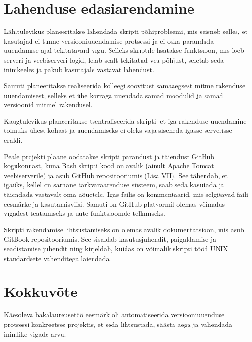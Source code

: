 \documentclass[12pt]{article}
\begin{document}
  \newpage
  
  \section{Lahenduse edasiarendamine}
  
  Lähitulevikus planeeritakse lahendada skripti põhiprobleemi, mis seisneb selles, et kasutajad ei tunne versiooniuuendamise protsessi ja ei oska parandada uuendamise ajal tekitatavaid vigu. Selleks skriptile lisatakse funktsioon, mis loeb serveri ja veebiserveri logid, leiab sealt tekitatud vea põhjust, seletab seda inimkeeles ja pakub kasutajale vastavat lahendust.
  
  Samuti planeeritakse realiseerida kolleegi soovitust samaaegsest mitme rakenduse uuendamisest, selleks et ühe korraga uuendada samad moodulid ja samad versioonid mitmel rakendusel.
  
  Kaugtulevikus planeeritakse tsentraliseerida skripti, et iga rakenduse uuendamine toimuks ühest kohast ja uuendamiseks ei oleks vaja siseneda igasse serverisse eraldi.
  
  Peale projekti plaane oodatakse skripti parandust ja täiendust GitHub kogukonnast, kuna Bash skripti kood on avalik (ainult Apache Tomcat veebiserverile) ja asub GitHub repositooriumis (Lisa VII). See tähendab, et igaüks, kellel on sarnane tarkvaraarenduse süsteem, saab seda kasutada ja täiendada vastavalt oma nõuetele. Igas failis on kommentaarid, mis selgitavad faili eesmärke ja kasutamisviisi. Samuti on GitHub platvormil olemas võimalus vigadest teatamiseks ja uute funktsioonide tellimiseks.
  
  Skripti rakendamise lihtsustamiseks on olemas avalik dokumentatsioon, mis asub GitBook repositooriumis. See sisaldab kasutusjuhendit, paigaldamise ja seadistamise juhendit ning kirjeldab, kuidas on võimalik skripti tööd UNIX standardsete vahenditega laiendada.
  
  \newpage
  
  \section*{Kokkuvõte}
  \label{kokkuvote}
  
  Käesoleva bakalaureusetöö eesmärk oli automatiseerida versiooniuuenduse protsessi konkreetses projektis, et seda lihtsustada, säästa aega ja vähendada inimlike vigade arvu.
  
\end{document}
